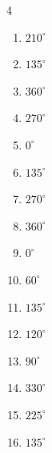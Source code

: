 \begin{multicols}{4}
\begin{enumerate}
  \item $\displaystyle 210^{\circ}$

  \item $\displaystyle 135^{\circ}$

  \item $\displaystyle 360^{\circ}$
        \phantom{$\displaystyle =2\pi$}

\columnbreak %

  \item $\displaystyle 270^{\circ}$

  \item $\displaystyle 0^{\circ}$
        \phantom{$\displaystyle =0$}

  \item $\displaystyle 135^{\circ}$

  \item $\displaystyle 270^{\circ}$

  \item $\displaystyle 360^{\circ}$
        \phantom{$\displaystyle =2\pi$}

  \item $\displaystyle 0^{\circ}$
        \phantom{$\displaystyle =0$}

  \item $\displaystyle 60^{\circ}$

  \item $\displaystyle 135^{\circ}$

  \item $\displaystyle 120^{\circ}$

  \item $\displaystyle 90^{\circ}$

  \item $\displaystyle 330^{\circ}$

  \item $\displaystyle 225^{\circ}$

  \item $\displaystyle 135^{\circ}$


\end{enumerate}
\end{multicols}
